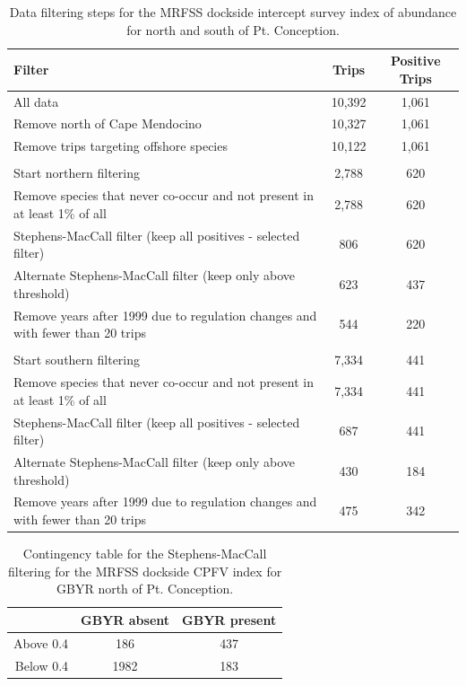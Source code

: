 \documentclass[12pt,]{article}
\begin{document}
\vspace{3cm}

\FloatBarrier

\begin{table}[!h]
\centering
\caption{Data filtering steps for the MRFSS dockside intercept survey 
                                           index of abundance for north and south of Pt. Conception.} 
\label{tab:Fleet10_11_Filter}
\begin{tabular}{>{\raggedright}p{4in}cc}
  \hline
Filter & Trips & Positive Trips \\ 
  \hline
All data & 10,392 & 1,061 \\ 
  Remove north of Cape Mendocino & 10,327 & 1,061 \\ 
  Remove trips targeting offshore species & 10,122 & 1,061 \\ 
   &  &  \\ 
  Start northern filtering & 2,788 & 620 \\ 
  Remove species that never co-occur and  not present in at least 1\% of all & 2,788 & 620 \\ 
  Stephens-MacCall filter (keep all positives - selected filter) & 806 & 620 \\ 
  Alternate Stephens-MacCall filter (keep only above threshold) & 623 & 437 \\ 
  Remove years after 1999 due to regulation changes and with fewer than 20 trips & 544 & 220 \\ 
   &  &  \\ 
  Start southern filtering & 7,334 & 441 \\ 
  Remove species that never co-occur and  not present in at least 1\% of all & 7,334 & 441 \\ 
  Stephens-MacCall filter (keep all positives - selected filter) & 687 & 441 \\ 
  Alternate Stephens-MacCall filter (keep only above threshold) & 430 & 184 \\ 
  Remove years after 1999 due to regulation changes and with fewer than 20 trips & 475 & 342 \\ 
   \hline
\end{tabular}
\end{table}

\clearpage
\newpage

\vspace{3cm}

\begin{table}[!h]
\centering
\caption{Contingency table for the Stephens-MacCall 
                                            filtering for the MRFSS dockside CPFV index 
                                            for GBYR north of Pt. Conception.} 
\label{tab:Fleet10_contingency}
\begin{tabular}{rcc}
  \hline
  & GBYR absent & GBYR present \\ 
  \hline
Above 0.4 & 186 & 437 \\ 
  Below 0.4 & 1982 & 183 \\ 
   \hline
\end{tabular}
\end{table}
\end{document}

